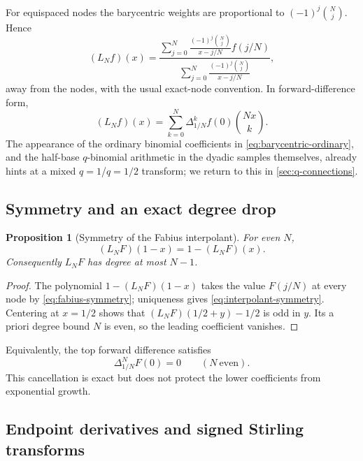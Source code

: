 \documentclass[11pt,oneside]{article}
\numberwithin{equation}{section}
\newtheorem{proposition}[theorem]{Proposition}
\theoremstyle{definition}
\theoremstyle{remark}
\begin{document}
For equispaced nodes the barycentric weights are proportional to
$(-1)^j\binom Nj$.  Hence
\begin{equation}
 (L_Nf)(x)=
 \frac{\displaystyle\sum_{j=0}^{N}
      \frac{(-1)^j\binom Nj}{x-j/N}f(j/N)}
      {\displaystyle\sum_{j=0}^{N}
      \frac{(-1)^j\binom Nj}{x-j/N}},
 \label{eq:barycentric-ordinary}
\end{equation}
away from the nodes, with the usual exact-node convention.  In forward-difference form,
\begin{equation}
 (L_Nf)(x)=\sum_{k=0}^{N}\Delta_{1/N}^{k}f(0)\binom{Nx}{k}.
 \label{eq:newton-ordinary}
\end{equation}
The appearance of the ordinary binomial coefficients in
\eqref{eq:barycentric-ordinary}, and the half-base $q$-binomial arithmetic in the dyadic
samples themselves, already hints at a mixed $q=1$/$q=1/2$ transform; we return to this in
\cref{sec:q-connections}.

\subsection{Symmetry and an exact degree drop}

\begin{proposition}[Symmetry of the Fabius interpolant]
\label{prop:symmetry}
For even $N$,
\begin{equation}
 (L_NF)(1-x)=1-(L_NF)(x).
 \label{eq:interpolant-symmetry}
\end{equation}
Consequently $L_NF$ has degree at most $N-1$.
\end{proposition}

\begin{proof}
The polynomial $1-(L_NF)(1-x)$ takes the value $F(j/N)$ at every node by
\eqref{eq:fabius-symmetry}; uniqueness gives \eqref{eq:interpolant-symmetry}.  Centering at
$x=1/2$ shows that $(L_NF)(1/2+y)-1/2$ is odd in $y$.  Its a priori degree bound $N$ is
even, so the leading coefficient vanishes.
\end{proof}

Equivalently, the top forward difference satisfies
\begin{equation}
 \Delta_{1/N}^{N}F(0)=0
 \qquad (N\ \text{even}).
 \label{eq:top-difference-zero}
\end{equation}
This cancellation is exact but does not protect the lower coefficients from exponential
growth.

\subsection{Endpoint derivatives and signed Stirling transforms}
\end{document}
